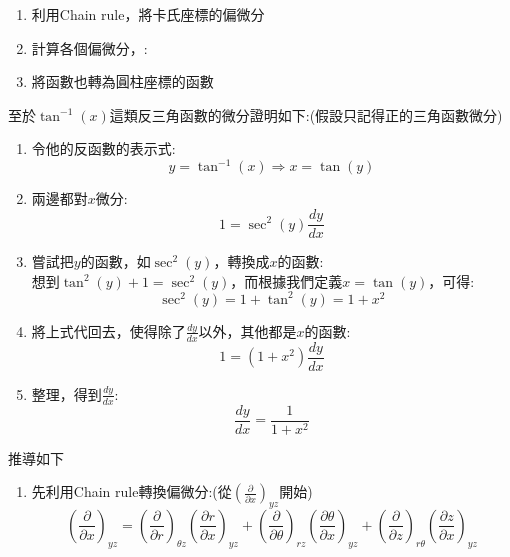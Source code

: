 \documentclass[../main.tex]{subfiles}
\begin{document}
\begin{itemize}
\begin{itemize}
\begin{enumerate}
        \item 利用Chain rule，將卡氏座標的偏微分
        \item 計算各個偏微分，:
        \item 將函數也轉為圓柱座標的函數
      \end{enumerate}
      至於$\tan^{-1}(x)$這類反三角函數的微分證明如下:(假設只記得正的三角函數微分)
      \begin{enumerate}
        \item 令他的反函數的表示式:
          \begin{equation}
            y = \tan^{-1}(x) \Rightarrow x = \tan(y) 
          \end{equation}
        \item 兩邊都對$x$微分:
          \begin{equation}
            1 = \sec^2(y) \frac{dy}{dx}
          \end{equation}
        \item 嘗試把$y$的函數，如$\sec^2(y)$，轉換成$x$的函數:\\
          想到$\tan^2(y) + 1 = \sec^2(y)$，而根據我們定義$x = \tan(y)$，可得:
          \begin{equation}
            \sec^2(y) = 1 + \tan^2(y) = 1 + x^2
          \end{equation}
        \item 將上式代回去，使得除了$\frac{dy}{dx}$以外，其他都是$x$的函數:
          \begin{equation}
            1 = (1 + x^2) \frac{dy}{dx}
          \end{equation}
        \item 整理，得到$\frac{dy}{dx}$:
          \begin{equation}
            \frac{dy}{dx} = \frac{1}{1 + x^2}
          \end{equation}
      \end{enumerate}
      推導如下
      \begin{enumerate}
        \item 先利用Chain rule轉換偏微分:(從$\left(\frac{\partial}{\partial x}\right)_{yz}$開始)
          \begin{equation}
            \left(\frac{\partial}{\partial x}\right)_{yz} =
            \left(\frac{\partial}{\partial r}\right)_{\theta z}\left(\frac{\partial r}{\partial x}\right)_{yz}
            + \left(\frac{\partial}{\partial \theta}\right)_{rz}\left(\frac{\partial \theta}{\partial x}\right)_{yz}
            + \left(\frac{\partial}{\partial z}\right)_{r\theta}\left(\frac{\partial z}{\partial x}\right)_{yz}

\end{equation}
\end{enumerate}
\end{itemize}
\end{itemize}
\end{document}
